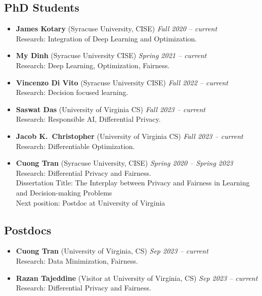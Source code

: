 
\subsection*{PhD Students}
\begin{itemize}
  \item \textbf{James Kotary} ({\sc Syracuse University}, CISE) 
  \hfill{\em Fall 2020 -- current}\\
  {\sc Research}: Integration of Deep Learning and Optimization.
  
  \item \textbf{My Dinh} ({\sc Syracuse University} CISE) 
  \hfill{\em Spring 2021 -- current}\\
  {\sc Research}: Deep Learning, Optimization, Fairness.

  \item \textbf{Vincenzo Di Vito} ({\sc Syracuse University} CISE)
  \hfill{\em Fall 2022 -- current}\\
  {\sc Research:} Decision focused learning.

  \item \textbf{Saswat Das} ({\sc University of Virginia} CS)
  \hfill{\em Fall 2023 -- current}\\
  {\sc Research:} Responsible AI, Differential Privacy.

  \item \textbf{Jacob K.~Christopher} ({\sc University of Virginia} CS)
  \hfill{\em Fall 2023 -- current}\\
  {\sc Research:} Differentiable Optimization.

  \item \textbf{Cuong Tran} ({\sc Syracuse University}, CISE) 
  \hfill{\em Spring 2020 -- Spring 2023}\\
  {\sc Research}: Differential Privacy and Fairness.\\
  {\sc Dissertation Title:} The Interplay between Privacy and Fairness in
  Learning and Decision-making Problems\\
  {\sc Next position:} Postdoc at University of Virginia 
\end{itemize}
\medskip

\subsection*{Postdocs}
\begin{itemize}
    \item \textbf{Cuong Tran} ({\sc University of Virginia}, CS) 
  \hfill{\em Sep 2023 -- current}\\
  {\sc Research}: Data Minimization, Fairness.

    \item \textbf{Razan Tajeddine} ({\sc Visitor at University of Virginia}, CS) 
  \hfill{\em Sep 2023 -- current}\\
  {\sc Research}: Differential Privacy and Fairness.
\end{itemize}

